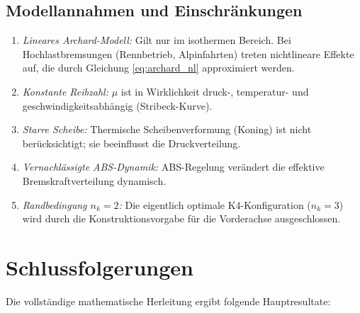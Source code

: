 ﻿\documentclass[12pt,a4paper]{article}
\theoremstyle{definition}
\begin{document}
\subsection{Modellannahmen und Einschränkungen}

\begin{enumerate}[leftmargin=2em]
  \item \textit{Lineares Archard-Modell:} Gilt nur im isothermen Bereich.
        Bei Hochlastbremsungen (Rennbetrieb, Alpinfahrten) treten
        nichtlineare Effekte auf, die durch Gleichung \eqref{eq:archard_nl}
        approximiert werden.
  \item \textit{Konstante Reibzahl:} $\mu$ ist in Wirklichkeit druck-,
        temperatur- und geschwindigkeitsabhängig (Stribeck-Kurve).
  \item \textit{Starre Scheibe:} Thermische Scheibenverformung (Koning)
        ist nicht berücksichtigt; sie beeinflusst die Druckverteilung.
  \item \textit{Vernachlässigte ABS-Dynamik:} ABS-Regelung verändert
        die effektive Bremskraftverteilung dynamisch.
  \item \textit{Randbedingung $n_k = 2$:} Die eigentlich optimale
        K4-Konfiguration ($n_k = 3$) wird durch die Konstruktions\-vorgabe
        für die Vorderachse ausgeschlossen.
\end{enumerate}

\section{Schlussfolgerungen}

Die vollständige mathematische Herleitung ergibt folgende Hauptresultate:
\end{document}
